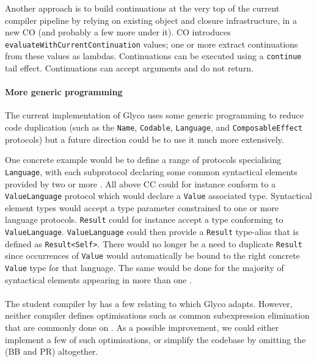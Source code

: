 \documentclass[main.tex]{subfiles}
\begin{document}
Another approach is to build continuations at the very top of the current compiler pipeline by relying on existing object and closure infrastructure, in a new  CO (and probably a few more  under it). CO introduces \texttt{evaluateWithCurrentContinuation} values; one or more  extract continuations from these values as lambdas. Continuations can be executed using a \texttt{continue} tail effect. Continuations can accept arguments and do not return.

\paragraph{More generic programming} The current implementation of Glyco uses some generic programming to reduce code duplication (such as the \texttt{Name}, \texttt{Codable}, \texttt{Language}, and \texttt{ComposableEffect} protocols) but a future direction could be to use it much more extensively.

One concrete example would be to define a range of protocols specialising \texttt{Language}, with each subprotocol declaring some common syntactical elements provided by two or more . All  above CC could for instance conform to a \texttt{ValueLanguage} protocol which would declare a \texttt{Value} associated type. Syntactical element types would accept a type parameter constrained to one or more language protocols. \texttt{Result} could for instance accept a type conforming to \texttt{ValueLanguage}. \texttt{ValueLanguage} could then provide a \texttt{Result} type-alias that is defined as \texttt{Result<Self>}. There would no longer be a need to duplicate \texttt{Result} since occurrences of \texttt{Value} would automatically be bound to the right concrete \texttt{Value} type for that language. The same would be done for the majority of syntactical elements appearing in more than one .

\paragraph{} The student compiler by \citet{compcourse} has a few  relating to  which Glyco adapts. However, neither compiler defines optimisations such as common subexpression elimination that are commonly done on . As a possible improvement, we could either implement a few of such optimisations, or simplify the codebase by omitting the   (BB and PR) altogether.

\biblio{}
\onlyinsubfile{\glsaddall\printglossaries}
\end{document}
